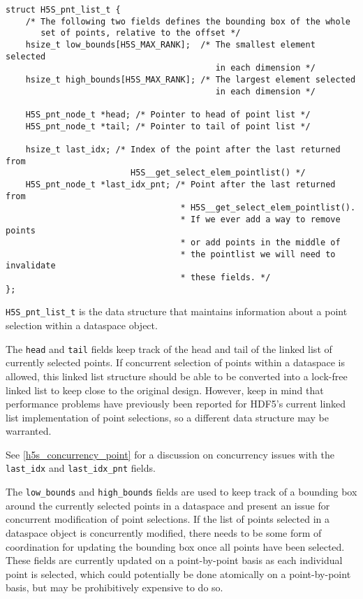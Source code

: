 \documentclass[../HDF5_RFC.tex]{subfiles}
\begin{document}
\begin{verbatim}
struct H5S_pnt_list_t {
    /* The following two fields defines the bounding box of the whole
       set of points, relative to the offset */
    hsize_t low_bounds[H5S_MAX_RANK];  /* The smallest element selected
                                          in each dimension */
    hsize_t high_bounds[H5S_MAX_RANK]; /* The largest element selected
                                          in each dimension */

    H5S_pnt_node_t *head; /* Pointer to head of point list */
    H5S_pnt_node_t *tail; /* Pointer to tail of point list */

    hsize_t last_idx; /* Index of the point after the last returned from
                         H5S__get_select_elem_pointlist() */
    H5S_pnt_node_t *last_idx_pnt; /* Point after the last returned from
                                   * H5S__get_select_elem_pointlist().
                                   * If we ever add a way to remove points
                                   * or add points in the middle of
                                   * the pointlist we will need to invalidate
                                   * these fields. */
};
\end{verbatim}

\texttt{H5S\_pnt\_list\_t} is the data structure that maintains information about a point
selection within a dataspace object.

The \texttt{head} and \texttt{tail} fields keep track of the head and tail of the linked
list of currently selected points. If concurrent selection of points within a dataspace
is allowed, this linked list structure should be able to be converted into a lock-free
linked list to keep close to the original design. However, keep in mind that performance
problems have previously been reported for HDF5's current linked list implementation of
point selections, so a different data structure may be warranted.

See \ref{h5s_concurrency_point} for a discussion on concurrency issues with the
\texttt{last\_idx} and \texttt{last\_idx\_pnt} fields.

The \texttt{low\_bounds} and \texttt{high\_bounds} fields are used to keep track of a bounding
box around the currently selected points in a dataspace and present an issue for concurrent
modification of point selections. If the list of points selected in a dataspace object is
concurrently modified, there needs to be some form of coordination for updating the bounding
box once all points have been selected. These fields are currently updated on a point-by-point
basis as each individual point is selected, which could potentially be done atomically on a
point-by-point basis, but may be prohibitively expensive to do so.
\end{document}
